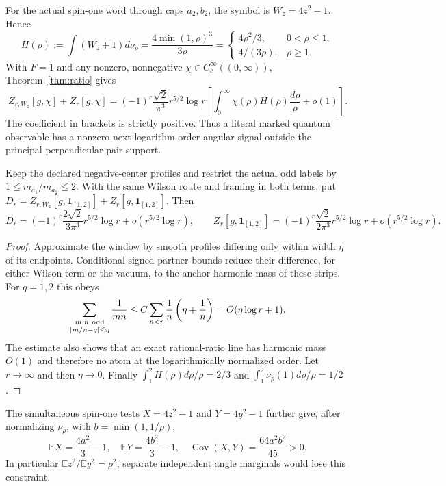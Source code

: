 For the actual spin-one word through caps $a_2,b_2$, the symbol is
$W_z=4z^2-1$. Hence
\[
 H(\rho):=\int(W_z+1)d\nu_\rho
 =\frac{4\min(1,\rho)^3}{3\rho}
 =\begin{cases}4\rho^2/3,&0<\rho\le1,\\
                 4/(3\rho),&\rho\ge1.
   \end{cases}
\]
With $F=1$ and any nonzero, nonnegative
$\chi\in C_c^\infty((0,\infty))$, Theorem~\ref{thm:ratio} gives
\begin{equation}\label{eq:ratio-nonzero}
 Z_{r,W_z}[g,\chi]+Z_r[g,\chi]
 =(-1)^r\frac{\sqrt2}{\pi^3}r^{5/2}\log r
   \left[\int_0^\infty\chi(\rho)H(\rho)\frac{d\rho}{\rho}
           +o(1)\right].
\end{equation}
The coefficient in brackets is strictly positive. Thus a literal
marked quantum observable has a nonzero next-logarithm-order angular
signal outside the principal perpendicular-pair support.

\begin{corollary}\label{cor:ratio-window}
Keep the declared negative-center profiles and restrict the actual
odd labels by $1\le m_{a_1}/m_{a_2}\le2$. With the same Wilson route
and framing in both terms, put
$D_r=Z_{r,W_z}[g,\mathbf1_{[1,2]}]+Z_r[g,\mathbf1_{[1,2]}]$.
Then
\[
 D_r=(-1)^r\frac{2\sqrt2}{3\pi^3}r^{5/2}\log r
                  +o(r^{5/2}\log r),
 \qquad
 Z_r[g,\mathbf1_{[1,2]}]
 =(-1)^r\frac{\sqrt2}{2\pi^3}r^{5/2}\log r
                  +o(r^{5/2}\log r).
\]
\end{corollary}
\begin{proof}
Approximate the window by smooth profiles differing only within
width $\eta$ of its endpoints. Conditional signed partner bounds
reduce their difference, for either Wilson term or the vacuum, to
the anchor harmonic mass of these strips. For $q=1,2$ this obeys
\[
 \sum_{\substack{m,n\ {\rm odd}\\|m/n-q|\le\eta}}
      \frac1{mn}
 \le C\sum_{n<r}\frac1n\left(\eta+\frac1n\right)
 =O(\eta\log r+1).
\]
The estimate also shows that an exact rational-ratio line has
harmonic mass $O(1)$ and therefore no atom at the logarithmically
normalized order. Let $r\to\infty$ and then $\eta\to0$.
Finally
$\int_1^2H(\rho)d\rho/\rho=2/3$ and
$\int_1^2\nu_\rho(1)d\rho/\rho=1/2$.
\end{proof}

The simultaneous spin-one tests $X=4z^2-1$ and $Y=4y^2-1$ further
give, after normalizing $\nu_\rho$, with $b=\min(1,1/\rho)$,
\[
 \mathbb EX=\frac{4a^2}{3}-1,\quad
 \mathbb EY=\frac{4b^2}{3}-1,\quad
 \operatorname{Cov}(X,Y)=\frac{64a^2b^2}{45}>0.
\]
In particular $\mathbb E z^2/\mathbb E y^2=\rho^2$; separate
independent angle marginals would lose this constraint.

